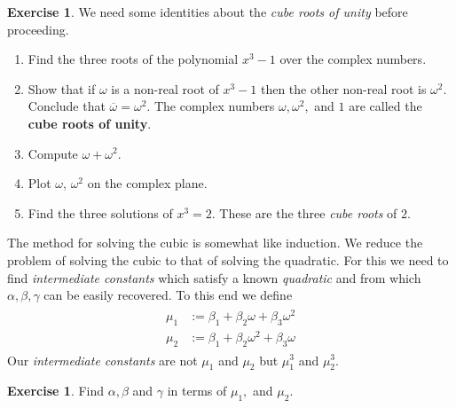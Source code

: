 \documentclass[reqno, 12pt, letter]{article}
\theoremstyle{plain}
\theoremstyle{definition}
\newtheorem{exercise}[theorem]{Exercise}
\theoremstyle{remark}
\numberwithin{equation}{section}
\newcommand{\hint}[1]{\footnote{{Hint:} #1\hfill}}
\let\footnote=\endnote
\begin{document}
	\begin{exercise}
	\label{exercise:cube_roots_of_unity}
	We need some identities about the \emph{cube roots of unity} before proceeding.
	\begin{enumerate}
		\item Find the three roots of the polynomial $ x^3 - 1$ over the complex numbers.
		\item Show that if $ \omega $ is a non-real root of $x^3 -1$ then the other non-real root is $ \omega^2$. Conclude that $ \overline{\omega} = \omega^2$.
			The complex numbers $\omega, \omega^2,$ and $1$ are called the \textbf{cube roots of unity}.
    \item Compute $ \omega + \omega^2$.
		\item Plot $ \omega$, $\omega^2$ on the complex plane.
		\item Find the three solutions of $ x^3 = 2$. These are the three \emph{cube roots} of $ 2$.
	\end{enumerate}
\end{exercise}
  The method for solving the cubic is somewhat like induction. We reduce the problem of solving the cubic to that of solving the quadratic. For this we need to find \emph{intermediate constants} which satisfy a known \emph{quadratic} and from which $\alpha,\beta,\gamma$ can be easily recovered. To this end we define
	\begin{align}
		\label{equation:intermediate_variables_cubic}
		\begin{split}
    \mu_1 &:= \beta_1 + \beta_2 \omega + \beta_3 \omega^2 \\
    \mu_2 &:= \beta_1 + \beta_2 \omega^2 + \beta_3 \omega
	\end{split}
  \end{align} 
	Our \emph{intermediate constants} are not $ \mu_1$ and $ \mu_2$ but $ \mu_1^3$ and $ \mu_2^3$.


	\begin{exercise}
		\label{exercise:intermediate_variables_cubic_1}
		Find $\alpha, \beta$ and $\gamma$ in terms of $ \mu_1,$ and $\mu_2$. \hint{Find $ \beta_1 + \beta_2$, $ \omega \beta_1 + \omega^2 \beta_2$, $ \omega^2 \beta_1 + \omega \beta_2$. }
	\end{exercise}
	
\end{document}

